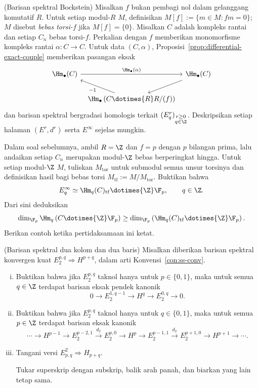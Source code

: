 \begin{Exercises}
	\item (Barisan spektral Bockstein) Misalkan $f$ bukan pembagi nol
	dalam gelanggang komutatif $R$. Untuk setiap modul-$R$ $M$, definisikan
	$M[f]:=\{m\in M:fm=0\}$; $M$ disebut \emph{bebas torsi-$f$} jika
	$M[f]=\{0\}$. Misalkan $C$ adalah kompleks rantai dan setiap $C_n$ bebas
	torsi-$f$. Perkalian dengan $f$ memberikan monomorfisme kompleks rantai
	$\alpha:C\to C$. Untuk data $(C,\alpha)$,
	Proposisi~\ref{prop:differential-exact-couple} memberikan pasangan eksak
	\[\begin{tikzcd}[column sep=tiny]
		\Hm_\bullet(C) \arrow[rr, "{\Hm_\bullet(\alpha)}"] & &
		\Hm_\bullet(C) \arrow[ld] \\
		& \Hm_\bullet\left(C\dotimes{R}R/(f)\right) \arrow[lu, "{-1}"] &
	\end{tikzcd}\]
	dan barisan spektral bergradasi homologis terkait
	$(E^r_q)_{\substack{r\geq0\\q\in\Z}}$. Deskripsikan setiap halaman
	$(E^r,d^r)$ serta $E^\infty$ sejelas mungkin.

	\item Dalam soal sebelumnya, ambil $R=\Z$ dan $f=p$ dengan $p$ bilangan prima, lalu
	andaikan setiap $C_n$ merupakan modul-$\Z$ bebas berperingkat hingga. Untuk
	setiap modul-$\Z$ $M$, tuliskan $M_{\mathrm{tor}}$ untuk submodul semua
	unsur torsinya dan definisikan hasil bagi bebas torsi
	$M_{\mathrm{tf}}:=M/M_{\mathrm{tor}}$. Buktikan bahwa
	\[ E^\infty_q\simeq\Hm_q(C)_{\mathrm{tf}}\dotimes{\Z}\F_p,
	\qquad q\in\Z. \]
	Dari sini deduksikan
	\[ \dim_{\F_p}\Hm_q\left(C\dotimes{\Z}\F_p\right)
	\geq\dim_{\F_p}\left(\Hm_q(C)_{\mathrm{tf}}\dotimes{\Z}\F_p\right). \]
	Berikan contoh ketika pertidaksamaan ini ketat.

	\item (Barisan spektral dua kolom dan dua baris) Misalkan diberikan barisan
	spektral konvergen kuat $E_2^{p,q}\Rightarrow H^{p+q}$, dalam arti
	Konvensi~\ref{con:ss-conv}.
	\begin{enumerate}[(i)]
		\item Buktikan bahwa jika $E_2^{p,q}$ taknol hanya untuk
		$p\in\{0,1\}$, maka untuk semua $q\in\Z$ terdapat barisan eksak pendek
		kanonik
		\[ 0\to E_2^{1,q-1}\to H^q\to E_2^{0,q}\to0. \]
		\item Buktikan bahwa jika $E_2^{p,q}$ taknol hanya untuk
		$q\in\{0,1\}$, maka untuk semua $p\in\Z$ terdapat barisan eksak kanonik
		\[ \cdots\to H^{p-1}\to E_2^{p-2,1}\xrightarrow{d_2}E_2^{p,0}
		\to H^p\to E_2^{p-1,1}\xrightarrow{d_2}E_2^{p+1,0}
		\to H^{p+1}\to\cdots. \]
		\item Tangani versi $E^2_{p,q}\Rightarrow H_{p+q}$.
		\begin{hint}
			Tukar superskrip dengan subskrip, balik arah panah, dan biarkan yang lain
			tetap sama.
		\end{hint}
	\end{enumerate}


\end{Exercises}
